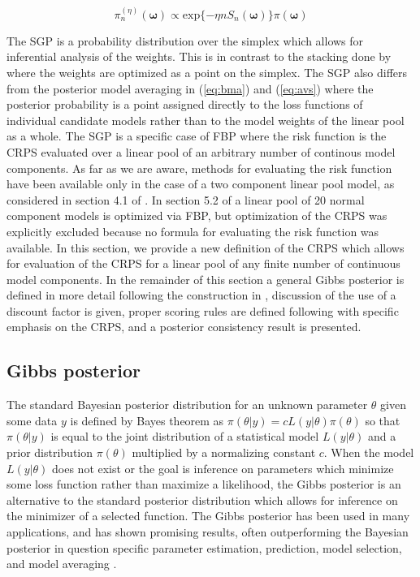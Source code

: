 \begin{equation}
    \label{eq:sgp}
    \pi^{(\eta)}_n (\boldsymbol{\omega}) \propto 
    \text{exp}\{-\eta n S_n(\boldsymbol{\omega})\} 
    \pi(\boldsymbol{\omega})
\end{equation}

The SGP is a probability distribution over the simplex
which allows for inferential 
analysis of the weights. This is in contrast to the stacking done by 
\cite{yao2018using} where the weights are optimized as a point on the simplex. 
The SGP also differs from the posterior model averaging in (\ref{eq:bma}) and 
(\ref{eq:avs}) where the posterior 
probability is a point assigned directly to the loss functions of 
individual candidate models rather than 
to the model weights of the linear pool as a whole. 
The SGP is a specific case of FBP where the risk function is the CRPS evaluated
over a linear pool of an arbitrary number of continous model components. 
As far as we are aware, methods for evaluating the risk function have been 
available only in the case of a two component linear pool model, as 
considered in section 4.1 of \cite[]{loaiza2021focused}. In section 5.2 of 
\cite[]{frazier2025loss} a linear pool
 of 20 normal component models is optimized via FBP, but 
 optimization of the CRPS
 was explicitly excluded because no formula for evaluating the risk function was
 available.
In this 
section, we provide a new definition of the CRPS which allows for evaluation
of the CRPS for a linear pool of any finite number of continuous 
model components.
In the remainder of this section a general Gibbs posterior is defined in 
more detail following the construction in \cite{martin2022direct}, 
discussion of the use of a
discount factor is given, proper scoring rules are 
defined following \cite{gneiting2007strictly} with specific emphasis on the 
CRPS, and a posterior consistency result is presented. 

\subsection{Gibbs posterior} \label{sec:gibb_post}

The standard Bayesian posterior distribution for an unknown parameter 
$\theta$ given some data $y$ is defined by Bayes theorem as 
$\pi(\theta | y ) = c L(y|\theta) \pi(\theta)$
so that $\pi(\theta|y)$ is equal to the joint distribution of a statistical 
model $L(y|\theta)$ and a prior distribution $\pi(\theta)$ multiplied by
a normalizing 
constant $c$. When the model $L(y|\theta)$ does not exist or the goal is 
inference on parameters which minimize some loss function rather than 
maximize a likelihood, the Gibbs posterior is an alternative to the standard 
posterior distribution which allows for inference on the minimizer of a 
selected function. The Gibbs posterior has been used in many applications, 
and has shown promising results, often outperforming the Bayesian posterior 
in question specific parameter estimation, prediction, model selection, and 
model averaging \cite[]{martin2022direct,loaiza2021focused,
lavine2021adaptive,syring2017gibbs,jiang2008gibbs}.


